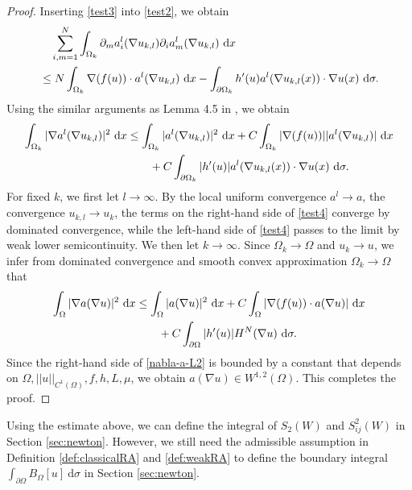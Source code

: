 \documentclass[reqno, 11pt]{amsart} %
\numberwithin{equation}{section}
\theoremstyle{definition}
\newcommand{\pa}{\partial}
\newcommand{\dx}{\textup{d}x}
\begin{document}
\begin{proof}
    Inserting \eqref{test3} into \eqref{test2}, we obtain
    \begin{align*}
       &\quad  \sum\limits_{i,m=1}^N  \int_{\Omega_k}\pa_m a_i^l(\nabla u_{k,l}) \pa_i a_m^l(\nabla u_{k,l}) \ \dx \\
        & \leq N \int_{\Omega_k} \nabla (f(u)) \cdot a^l(\nabla u_{k,l})  \ \dx  - \int_{\pa \Omega_k} h'(u)a^l(\nabla u_{k,l}(x)) \cdot  \nabla u(x) \ \text{d} \sigma.
    \end{align*}
    Using the similar arguments as Lemma 4.5 in \cite{AKM2018}, we obtain
    \begin{align}\label{test4}
        \int_{\Omega_k} |\nabla a^l(\nabla u_{k,l}) |^2 \ \dx & \leq \int_{\Omega_k} |a^l(\nabla u_{k,l}) |^2 \ \dx +  C \int_{\Omega_k} |\nabla (f(u)) | | a^l(\nabla u_{k,l}) | \ \dx \\
        & \qquad + C  \int_{\pa \Omega_k}| h'(u)|a^l(\nabla u_{k,l}(x)) \cdot  \nabla u(x) \ \text{d} \sigma. \nonumber 
    \end{align}
    For fixed $k$, we first let $l\to\infty$. By the local uniform convergence $a^l\to a$, the convergence $u_{k,l}\to u_k$, the terms on the right-hand side of \eqref{test4} converge by dominated convergence, while the left-hand side of \eqref{test4} passes to the limit by weak lower semicontinuity. We then let $k\to\infty$. Since $\Omega_k \to\Omega$ and $u_k\to u$, we infer from dominated convergence and smooth convex approximation $\Omega_k\to\Omega$ that
    \begin{align}\label{nabla-a-L2}
        \int_{\Omega} |\nabla a(\nabla u) |^2 \ \dx & \leq \int_{\Omega} |a(\nabla u) |^2 \ \dx +  C \int_{\Omega} |\nabla (f(u)) \cdot a(\nabla u)|  \ \dx \\
        & \qquad + C  \int_{\pa \Omega} |h'(u)|H^N(\nabla u) \ \text{d} \sigma.\nonumber %
    \end{align}
    Since the right-hand side of \eqref{nabla-a-L2} is bounded by a constant that depends on $\Omega, ||u||_{C^1(\Omega)}, f,h, L, \mu$, we obtain $a(\nabla u) \in W^{1,2}(\Omega)$. This completes the proof.
\end{proof}


Using the estimate above, we can define the integral of $S_2(W)$ and $S_{ij}^2(W)$ in Section \ref{sec:newton}. However, we still need the admissible assumption in Definition \ref{def:classicalRA} and \ref{def:weakRA} to define the boundary integral $\int_{\pa \Omega} B_{\Omega}[u] \ \text{d} \sigma$ in Section \ref{sec:newton}. %
\end{document}
